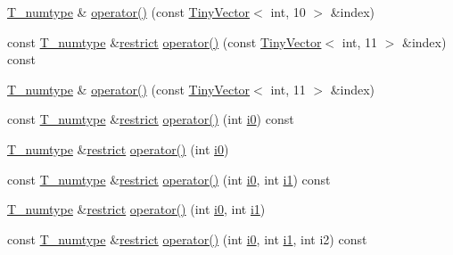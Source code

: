 \begin{DoxyCompactItemize}
\item 
\hyperlink{classArray_ae72770f4a1d2f8b7193badafc320f008}{T\+\_\+numtype} \& \hyperlink{classArray_a39772df419b0a5fd899a0a66bd45e2d9}{operator()} (const \hyperlink{classTinyVector}{Tiny\+Vector}$<$ int, 10 $>$ \&index)
\item 
const \hyperlink{classArray_ae72770f4a1d2f8b7193badafc320f008}{T\+\_\+numtype} \&\hyperlink{compiler_8h_a080abdcb9c02438f1cd2bb707af25af8}{restrict} \hyperlink{classArray_acb3302e30614fce17397949fff9ae956}{operator()} (const \hyperlink{classTinyVector}{Tiny\+Vector}$<$ int, 11 $>$ \&index) const 
\item 
\hyperlink{classArray_ae72770f4a1d2f8b7193badafc320f008}{T\+\_\+numtype} \& \hyperlink{classArray_a7980e02a2354e9ef45b3533bc0394314}{operator()} (const \hyperlink{classTinyVector}{Tiny\+Vector}$<$ int, 11 $>$ \&index)
\item 
const \hyperlink{classArray_ae72770f4a1d2f8b7193badafc320f008}{T\+\_\+numtype} \&\hyperlink{compiler_8h_a080abdcb9c02438f1cd2bb707af25af8}{restrict} \hyperlink{classArray_a6e7d61ee6e4837348498d844f2a2f751}{operator()} (int \hyperlink{cephes_8h_aacd2643d920288e61be16787561a4514}{i0}) const 
\item 
\hyperlink{classArray_ae72770f4a1d2f8b7193badafc320f008}{T\+\_\+numtype} \&\hyperlink{compiler_8h_a080abdcb9c02438f1cd2bb707af25af8}{restrict} \hyperlink{classArray_a65567fb25e7218c096cab93061caa915}{operator()} (int \hyperlink{cephes_8h_aacd2643d920288e61be16787561a4514}{i0})
\item 
const \hyperlink{classArray_ae72770f4a1d2f8b7193badafc320f008}{T\+\_\+numtype} \&\hyperlink{compiler_8h_a080abdcb9c02438f1cd2bb707af25af8}{restrict} \hyperlink{classArray_aa44208dec3b1b98b44c409112611c9b5}{operator()} (int \hyperlink{cephes_8h_aacd2643d920288e61be16787561a4514}{i0}, int \hyperlink{cephes_8h_ab24474d03df1f9adf1700c2c1badd1a5}{i1}) const 
\item 
\hyperlink{classArray_ae72770f4a1d2f8b7193badafc320f008}{T\+\_\+numtype} \&\hyperlink{compiler_8h_a080abdcb9c02438f1cd2bb707af25af8}{restrict} \hyperlink{classArray_ac8f2c863ca0c58623350eeeca3d33c25}{operator()} (int \hyperlink{cephes_8h_aacd2643d920288e61be16787561a4514}{i0}, int \hyperlink{cephes_8h_ab24474d03df1f9adf1700c2c1badd1a5}{i1})
\item 
const \hyperlink{classArray_ae72770f4a1d2f8b7193badafc320f008}{T\+\_\+numtype} \&\hyperlink{compiler_8h_a080abdcb9c02438f1cd2bb707af25af8}{restrict} \hyperlink{classArray_aec6c025ed9dd4bd84562109087cc55d1}{operator()} (int \hyperlink{cephes_8h_aacd2643d920288e61be16787561a4514}{i0}, int \hyperlink{cephes_8h_ab24474d03df1f9adf1700c2c1badd1a5}{i1}, int i2) const 

\end{DoxyCompactItemize}
